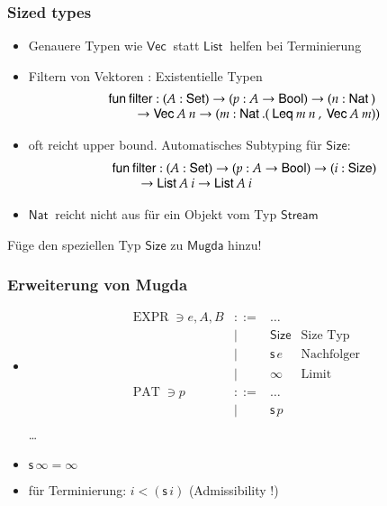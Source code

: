 \documentclass[12pt,red,serif,mathserif]{beamer}
\newcommand{\Set}{\mathsf{Set}}
\newcommand{\s}{\mathsf{s}\,}
\newcommand{\Size}{\mathsf{Size}}
\newcommand{\fun}{\mathsf{fun}\:}
\newcommand{\Nat}{\mathsf{Nat}\:}
\newcommand{\Bool}{\mathsf{Bool}}
\newcommand{\List}{\mathsf{List}\:}
\newcommand{\vVec}{\mathsf{Vec}\:}
\newcommand{\Stream}{\mathsf{Stream}\:}
\newcommand{\filter}{\mathsf{filter}}
\newcommand{\tLeq}{\mathsf{Leq}\:}
\newcommand{\ra}{\rightarrow}
\newcommand{\spcx}{\hspace*{8mm}}
\newcommand{\mugda}{\textsf{Mugda} }
\newcommand{\opn}[1]{\operatorname{#1}}
\newcommand{\Expr}{\opn{EXPR}}
\newcommand{\Pat}{\opn{PAT}}
\begin{document}
\frame
{

\frametitle{ Sized types }
\begin{itemize}
\item
Genauere Typen wie $\vVec$ statt $\List$ helfen bei Terminierung
\item Filtern von Vektoren : Existentielle Typen
\[
\begin{array}{l}
\fun \filter : (A : \Set ) \ra (p : A \ra \Bool ) \ra (n : \Nat ) \\
\spcx \ra \vVec A \: n \ra (m : \Nat . (\: \tLeq m \: n \:, \: \vVec A \: m))
\end{array}
\]
\item
oft reicht upper bound. Automatisches Subtyping f\"ur $\Size$:
\[
\begin{array}{l}
\fun \filter : (A : \Set ) \ra (p : A \ra \Bool ) \ra (i : \Size ) \\
\spcx \ra \List A \: i \ra \List A \: i
\end{array}
\]
\item
$\Nat$ reicht nicht aus f\"ur ein Objekt vom Typ $\Stream$
\end{itemize}

F\"uge den speziellen Typ $\Size$ zu $\mugda$ hinzu!

}

\frame
{

\frametitle{ Erweiterung von Mugda }

\begin{itemize}
\item
\[
\begin{array}{lrll}
\Expr \ni e,A,B & ::= & \ldots & \\
& \mid & \Size & \mbox{Size Typ} \\
& \mid & \s e  & \mbox{Nachfolger}\\
& \mid & \infty & \mbox{Limit}\\
\Pat \ni p & ::= & \ldots & \\
& \mid & \s p & \\
\end{array}
\]
\dots
\vspace*{0.2cm}
\item
$\s \infty = \infty$
\vspace*{0.2cm}
\item
f\"ur Terminierung: $i < (\s i)$ (Admissibility !)
\end{itemize}
}
\end{document}
